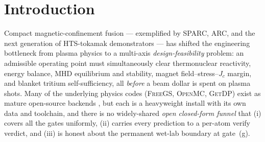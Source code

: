 \documentclass[11pt,a4paper]{article}
\begin{document}
\section{Introduction}
\label{sec:intro}

Compact magnetic-confinement fusion --- exemplified by SPARC, ARC, and
the next generation of HTS-tokamak demonstrators
\citep{creely2020sparc,sorbom2015arc,hartwig2024sparcmagnet} --- has
shifted the engineering bottleneck from plasma physics to a multi-axis
\emph{design-feasibility} problem: an admissible operating point must
simultaneously clear thermonuclear reactivity, energy balance, MHD
equilibrium and stability, magnet field--stress--$J_{\!c}$ margin, and
blanket tritium self-sufficiency, all \emph{before} a beam dollar is
spent on plasma shots. Many of the underlying physics codes
(\textsc{FreeGS}, \textsc{OpenMC}, \textsc{GetDP}) exist as mature
open-source backends \citep{freegs,romano2015openmc,getdp}, but each is
a heavyweight install with its own data and toolchain, and there is no
widely-shared \emph{open closed-form funnel} that (i) covers all the
gates uniformly, (ii) carries every prediction to a per-atom verify
verdict, and (iii) is honest about the permanent wet-lab boundary at
gate~(g).
\end{document}
